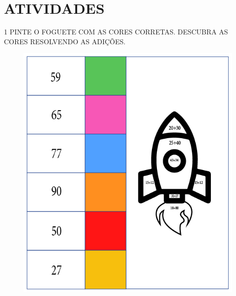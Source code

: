 \pagebreak
\section{ATIVIDADES}

\num{1} PINTE O FOGUETE COM AS CORES CORRETAS. DESCUBRA AS CORES RESOLVENDO AS
ADIÇÕES.


\begin{figure}[htpb!]
\centering
\includegraphics[width=\textwidth]{./media/SAEB_1ANO_MAT_FIGURA19.png}
\end{figure}



